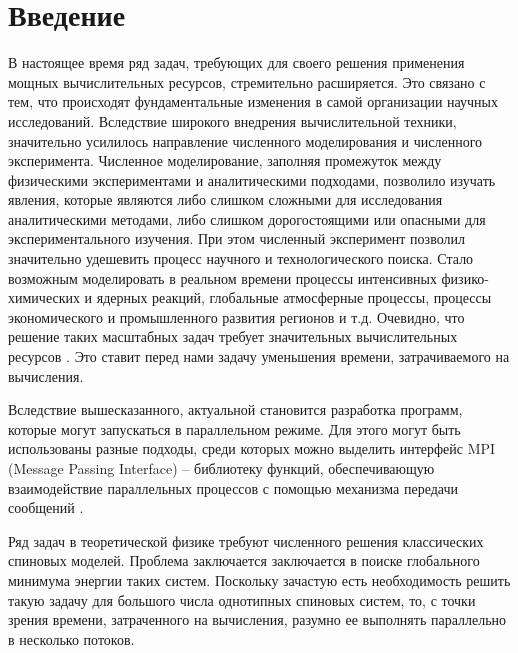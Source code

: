 \documentclass[14pt,a4paper,report]{ncc}
\begin{document}
\tableofcontents
\newpage

\chapter*{Введение}
В настоящее время ряд задач, требующих для своего решения применения мощных вычислительных ресурсов, стремительно расширяется. Это связано с тем, что происходят фундаментальные изменения в самой организации научных исследований. Вследствие широкого внедрения вычислительной техники, значительно усилилось направление численного моделирования и численного эксперимента. Численное моделирование, заполняя промежуток между физическими экспериментами и аналитическими подходами, позволило изучать явления, которые являются либо слишком сложными для исследования аналитическими методами, либо слишком дорогостоящими или опасными для экспериментального изучения. При этом численный эксперимент позволил значительно удешевить процесс научного и технологического поиска. Стало возможным моделировать в реальном времени процессы интенсивных физико-химических и ядерных реакций, глобальные атмосферные процессы, процессы экономического и промышленного развития регионов и т.д. Очевидно, что решение таких масштабных задач требует значительных вычислительных ресурсов \cite{litlink0}. Это ставит перед нами задачу уменьшения времени, затрачиваемого на вычисления.
\

Вследствие вышесказанного, актуальной становится разработка программ, которые могут запускаться в параллельном режиме. Для этого могут быть использованы разные подходы, среди которых можно выделить интерфейс MPI (Message Passing Interface) -- библиотеку функций, обеспечивающую взаимодействие параллельных процессов с помощью механизма передачи сообщений \cite{litlink1}.
\

Ряд задач в теоретической физике требуют численного решения классических спиновых моделей. Проблема заключается заключается в поиске глобального минимума энергии таких систем. Поскольку зачастую есть необходимость решить такую задачу для большого числа однотипных спиновых систем, то, с точки зрения времени, затраченного на вычисления, разумно ее выполнять параллельно в несколько потоков.
\end{document}
